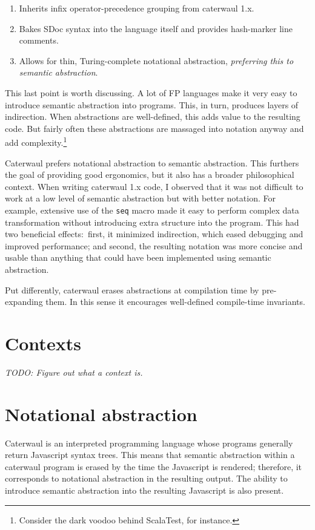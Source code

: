 \documentclass{report}
\begin{document}
\begin{enumerate}
\item{Inherits infix operator-precedence grouping from caterwaul 1.x.}
\item{Bakes SDoc syntax into the language itself and provides hash-marker line comments.}
\item{Allows for thin, Turing-complete notational abstraction, {\em preferring this to semantic abstraction}.}
\end{enumerate}

    This last point is worth discussing. A lot of FP languages make it very easy to introduce semantic abstraction into programs. This, in turn, produces layers of indirection. When
    abstractions are well-defined, this adds value to the resulting code. But fairly often these abstractions are massaged into notation anyway and add complexity.\footnote{Consider the dark
    voodoo behind ScalaTest, for instance.}

    Caterwaul prefers notational abstraction to semantic abstraction. This furthers the goal of providing good ergonomics, but it also has a broader philosophical context. When writing
    caterwaul 1.x code, I observed that it was not difficult to work at a low level of semantic abstraction but with better notation. For example, extensive use of the {\tt seq} macro made it
    easy to perform complex data transformation without introducing extra structure into the program. This had two beneficial effects:~first, it minimized indirection, which eased debugging
    and improved performance; and second, the resulting notation was more concise and usable than anything that could have been implemented using semantic abstraction.

    Put differently, caterwaul erases abstractions at compilation time by pre-expanding them. In this sense it encourages well-defined compile-time invariants.

\chapter{Contexts}
  {\em TODO: Figure out what a context is.}

\chapter{Notational abstraction}
  Caterwaul is an interpreted programming language whose programs generally return Javascript syntax trees. This means that semantic abstraction within a caterwaul program is erased by the
  time the Javascript is rendered; therefore, it corresponds to notational abstraction in the resulting output. The ability to introduce semantic abstraction into the resulting Javascript is
  also present.
\end{document}

